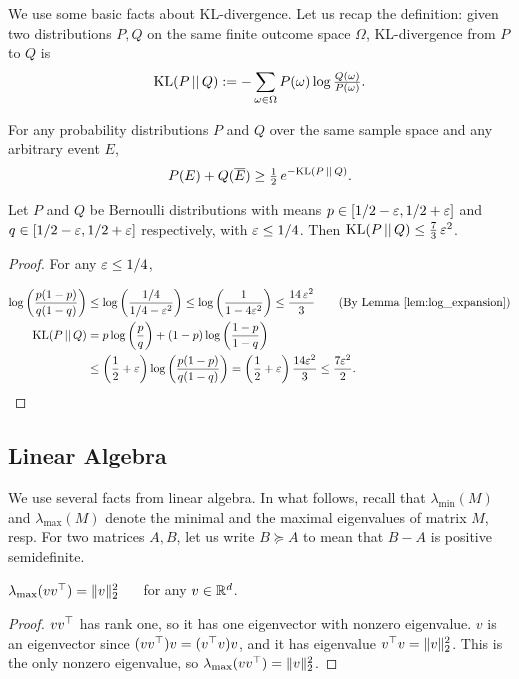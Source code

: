 We use some basic facts about KL-divergence. Let us recap the definition: given two distributions $P,Q$ on the same finite outcome space $\Omega$, KL-divergence from $P$ to $Q$ is
\[ \text{KL}(P \, ||\, Q) := - \sum_{\omega \in \Omega} P(\omega) \log \tfrac{Q(\omega)}{P(\omega)} .\]

\begin{lemma}
\label{lem:pinkser}
For any probability distributions $P$ and $Q$ over the same sample space and any arbitrary event $E$,
\[
P(E) + Q(\overline{E}) \ge \tfrac{1}{2}\, e^{-\text{KL}(P \, ||\, Q)}.
\]
\end{lemma}



\begin{lemma}
\label{lem:bern_kl}
Let $P$ and $Q$ be Bernoulli distributions with means $p \in [1/2-\varepsilon,
1/2+\varepsilon]$ and $q \in [1/2-\varepsilon, 1/2+\varepsilon]$ respectively, with $\varepsilon \le 1/4$. Then
  $\text{KL}(P \, ||\, Q) \le \frac{7}{3}\,\varepsilon^2$.
\end{lemma}
\begin{proof}
For any $\varepsilon \le 1/4$,

\begin{align*}
\log \p{\frac{p(1-p)}{q(1-q)}} &\le
\log\p{\frac{1/4}{1/4-\eps^2}} \le
\log\p{\frac{1}{1-4\eps^2}}    \le
 \frac{14\, \eps^2}{3} \tag {By
    Lemma~\ref{lem:log_expansion}}
\\
  \kl{P}{Q} &= p \log \p{\frac{p}{q}} + (1-p) \log\p{\frac{1-p}{1-q}} \\
  &\le \p{\frac{1}{2} + \eps} \log \p{\frac{p(1-p)}{q(1-q)}}
    = \p{\frac{1}{2} + \eps} \frac{14 \eps^2}{3}
   \le \frac{7\eps^2}{2}.
\end{align*}
\end{proof}


\subsection{Linear Algebra}

We use several facts from linear algebra. In what follows, recall that
$\lambda_{\min}(M)$ and $\lambda_{\max}(M)$ denote the minimal and the maximal eigenvalues of matrix $M$, resp.
For two matrices $A,B$, let us write $B \succeq A$ to mean that $B-A$ is positive semidefinite.

\begin{lemma}
    $\lambda_{\max}(vv^{\top}) = \|v\|_2^2$ ~~ for any $v \in \mathbb{R}^d$.
  \label{lem:norm_eigen}
\end{lemma}
\begin{proof}
  $vv^{\top}$ has rank one, so it has one eigenvector with nonzero eigenvalue. $v$
  is an eigenvector since $(vv^{\top})v = (v^{\top} v) v$, and it has eigenvalue
  $v^{\top} v = \|v\|_2^2$. This is the only nonzero eigenvalue, so
  $\lambda_{\max}(vv^{\top}) = \|v\|_2^2$.
\end{proof}

